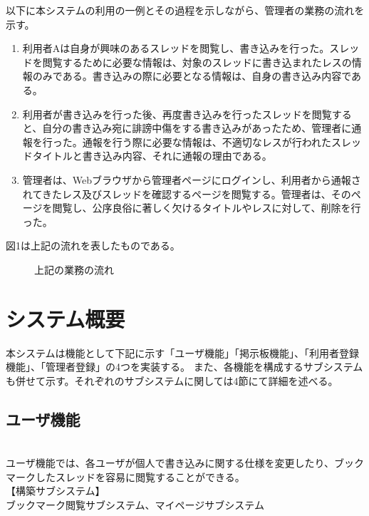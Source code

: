 \documentclass[a4j]{jarticle}
\begin{document}
以下に本システムの利用の一例とその過程を示しながら、管理者の業務の流れを示す。

\begin{enumerate}
  \item 利用者Aは自身が興味のあるスレッドを閲覧し、書き込みを行った。スレッドを閲覧するために必要な情報は、対象のスレッドに書き込まれたレスの情報のみである。書き込みの際に必要となる情報は、自身の書き込み内容である。

  \item  利用者が書き込みを行った後、再度書き込みを行ったスレッドを閲覧すると、自分の書き込み宛に誹謗中傷をする書き込みがあったため、管理者に通報を行った。通報を行う際に必要な情報は、不適切なレスが行われたスレッドタイトルと書き込み内容、それに通報の理由である。
  \item  管理者は、Webブラウザから管理者ページにログインし、利用者から通報されてきたレス及びスレッドを確認するページを閲覧する。管理者は、そのページを閲覧し、公序良俗に著しく欠けるタイトルやレスに対して、削除を行った。
\end{enumerate}

図1は上記の流れを表したものである。


\begin{figure}[h!]
\begin{center}
\caption{上記の業務の流れ}
\label{fig:figuretest}
\end{center}
\end{figure}














\section{システム概要}
本システムは機能として下記に示す「ユーザ機能」「掲示板機能」、「利用者登録機能」、「管理者登録」の4つを実装する。
 また、各機能を構成するサブシステムも併せて示す。それぞれのサブシステムに関しては4節にて詳細を述べる。

\subsection{ユーザ機能}
\\ユーザ機能では、各ユーザが個人で書き込みに関する仕様を変更したり、ブックマークしたスレッドを容易に閲覧することができる。
\\【構築サブシステム】
\\ブックマーク閲覧サブシステム、マイページサブシステム
\end{document}
